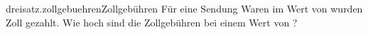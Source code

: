 \begin{exercise}{dreisatz.zollgebuehren}{Zollgebühren}
  \ifproblem\problem
    Für eine Sendung Waren im Wert von  wurden  Zoll gezahlt.
    Wie hoch sind die Zollgebühren bei einem Wert von ?
  \fi
\end{exercise}

